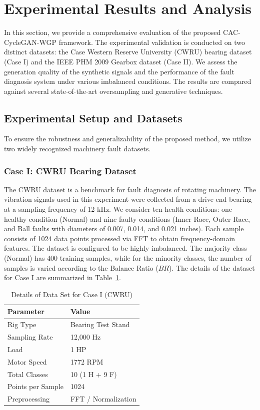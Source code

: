 \section{Experimental Results and Analysis}
\label{sec:experiments}

In this section, we provide a comprehensive evaluation of the proposed CAC-CycleGAN-WGP framework. The experimental validation is conducted on two distinct datasets: the Case Western Reserve University (CWRU) bearing dataset (Case I) and the IEEE PHM 2009 Gearbox dataset (Case II). We assess the generation quality of the synthetic signals and the performance of the fault diagnosis system under various imbalanced conditions. The results are compared against several state-of-the-art oversampling and generative techniques.

\subsection{Experimental Setup and Datasets}
To ensure the robustness and generalizability of the proposed method, we utilize two widely recognized machinery fault datasets.

\subsubsection{Case I: CWRU Bearing Dataset}
The CWRU dataset is a benchmark for fault diagnosis of rotating machinery. The vibration signals used in this experiment were collected from a drive-end bearing at a sampling frequency of 12 kHz. We consider ten health conditions: one healthy condition (Normal) and nine faulty conditions (Inner Race, Outer Race, and Ball faults with diameters of 0.007, 0.014, and 0.021 inches). Each sample consists of 1024 data points processed via FFT to obtain frequency-domain features. The dataset is configured to be highly imbalanced. The majority class (Normal) has 400 training samples, while for the minority classes, the number of samples is varied according to the Balance Ratio ($BR$). The details of the dataset for Case I are summarized in Table~\ref{tab:case1_details}.

\begin{table}[htbp]
\centering
\caption{Details of Data Set for Case I (CWRU)}
\label{tab:case1_details}
\begin{tabular}{ll}
\hline
\textbf{Parameter} & \textbf{Value} \\ \hline
Rig Type & Bearing Test Stand \\
Sampling Rate & 12,000 Hz \\
Load & 1 HP \\
Motor Speed & 1772 RPM \\
Total Classes & 10 (1 H + 9 F) \\
Points per Sample & 1024 \\
Preprocessing & FFT / Normalization \\
\hline
\end{tabular}
\end{table}

